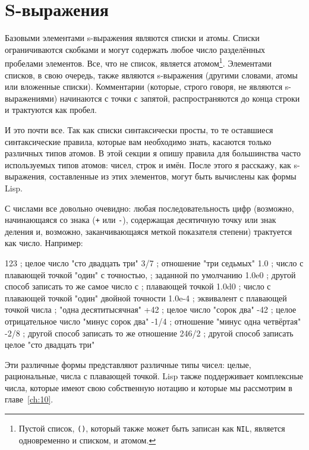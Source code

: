 \section{S-выражения}

Базовыми элементами s-выражения являются списки и атомы. Списки ограничиваются скобками и
могут содержать любое число разделённых пробелами элементов. Все, что не список, является
атомом\footnote{Пустой список, \lstinline{()}, который также может быть записан как
  \lstinline{NIL}, является одновременно и списком, и атомом.}. Элементами списков, в свою
очередь, также являются s-выражения (другими словами, атомы или вложенные
списки). Комментарии (которые, строго говоря, не являются s-выражениями) начинаются с
точки с запятой, распространяются до конца строки и трактуются как пробел.

И это почти все. Так как списки синтаксически просты, то те оставшиеся синтаксические
правила, которые вам необходимо знать, касаются только различных типов атомов. В этой
секции я опишу правила для большинства часто используемых типов атомов: чисел, строк и
имён. После этого я расскажу, как s-выражения, составленные из этих элементов, могут быть
вычислены как формы Lisp.

С числами все довольно очевидно: любая последовательность цифр (возможно, начинающаяся со
знака (\lstinline{+} или \lstinline{-}), содержащая десятичную точку или знак деления и, возможно,
заканчивающаяся меткой показателя степени) трактуется как число. Например:

\begin{myverb}
  123       ; целое число "сто двадцать три"
  3/7       ; отношение "три седьмых"
  1.0       ; число с плавающей точкой "один" с точностью, 
            ; заданной по умолчанию
  1.0e0     ; другой способ записать то же самое число с
            ; плавающей точкой
  1.0d0     ; число с плавающей точкой "один" двойной точности
  1.0e-4    ; эквивалент с плавающей точкой числа
            ; "одна десятитысячная"
  +42       ; целое число "сорок два"
  -42       ; целое отрицательное число "минус сорок два"
  -1/4      ; отношение "минус одна четвёртая"
  -2/8      ; другой способ записать то же отношение
  246/2     ; другой способ записать целое "сто двадцать три"
\end{myverb}

Эти различные формы представляют различные типы чисел: целые, рациональные, числа с
плавающей точкой. Lisp также поддерживает комплексные числа, которые имеют свою
собственную нотацию и которые мы рассмотрим в главе~\ref{ch:10}.

